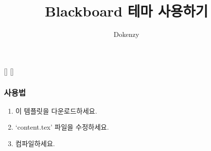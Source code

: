 \usepackage[export]{adjustbox}
\usepackage{booktabs}

\usepackage{kotex}
[]
\setmonofont{Monaco}
[] %

\usepackage{listings}
\lstset{
    basicstyle=\footnotesize
}

\newcommand\independent{\protect\mathpalette{\protect\independenT}{\perp}}
\def\independenT#1#2{\mathrel{\rlap{$#1#2$}\mkern2mu{#1#2}}}
\usepackage{tikz}
\usetikzlibrary{positioning}
\usetikzlibrary{shapes,plotmarks,decorations.pathreplacing,automata}



\newcommand{\whitepic}[2]{
  \begin{center}
    \begin{tikzpicture}[scale=4, show background rectangle, background
      rectangle/.style={fill=white}]
      \node (label) at
      (0,0)[draw=black]{\texttt{[image: \#1]}};
    \end{tikzpicture}
  \end{center}
}

\newcommand{\rwhitepic}[2]{
\hfill   \begin{tikzpicture}[scale=4, show background rectangle, background
      rectangle/.style={fill=white}]
      \node (label) at
      (0,0)[draw=black]{\texttt{[image: \#1]}};
    \end{tikzpicture}
}


% 

\usepackage{tikz}\usetikzlibrary{arrows,positioning,shapes.geometric,calc,through,backgrounds}
\author{Dokenzy}
\date{\vspace{-1em}}
\title{Blackboard 테마 사용하기}


\maketitle

\begin{frame}[fragile]
\frametitle{사용법}
\begin{enumerate}
\item 이 템플릿을 다운로드하세요.
\item `content.tex' 파일을 수정하세요.
\item 컴파일하세요.
\end{enumerate}
\end{frame}


